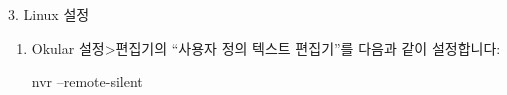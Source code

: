 \documentclass{beamer}
\begin{document}
\begin{frame}{3. Linux 설정}
\begin{enumerate}
    \item Okular 설정>편집기의 ``사용자 정의 텍스트 편집기''를 다음과 같이
      설정합니다:
      \begin{shellcode}
        nvr --remote-silent %
      \end{shellcode}
  \end{enumerate}
\end{frame}
\end{document}
